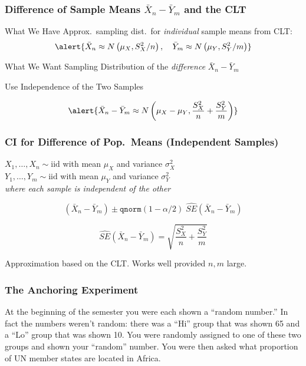 \begin{frame}
\frametitle{Difference of Sample Means $\bar{X}_n-\bar{Y}_m$ and the CLT}
\begin{block}{What We Have}
Approx.\ sampling dist.\ for \emph{individual}  sample means from CLT:
\[\alert{\bar{X}_n\approx N\left(\mu_X, S_X^2/n\right), \quad \bar{Y}_m\approx N\left(\mu_Y, S_Y^2/m\right)}\]
\end{block}

\begin{block}{What We Want}
Sampling Distribution of the \emph{difference} $\bar{X}_n - \bar{Y}_m$
\end{block}

\begin{block}{Use Independence of the Two Samples}
  
  \[\alert{\bar{X}_n - \bar{Y}_m\approx N\left( \mu_X - \mu_Y, \displaystyle \frac{S_X^2}{n} + \frac{S_Y^2}{m}\right)}\]

\end{block}


\end{frame}
\begin{frame}
\frametitle{CI for Difference of Pop.\ Means (Independent Samples)}

$X_1, \hdots, X_n \sim \mbox{iid}$ with mean $\mu_X$ and variance $\sigma_X^2$\\ $Y_1, \hdots, Y_m \sim \mbox{iid}$ with mean $\mu_Y$ and variance $\sigma_Y^2$\\
\emph{where each sample is independent of the other } 

\[\left(\bar{X}_n - \bar{Y}_m\right) \pm \texttt{qnorm}(1-\alpha/2)\; \widehat{SE}(\bar{X}_n - \bar{Y}_m)\]

  \[
    \widehat{SE}(\bar{X}_n - \bar{Y}_m) = \sqrt{\frac{S_X^2}{n} + \frac{S_Y^2}{m}}
  \]

	\alert{Approximation based on the CLT. Works well provided $n,m$ large.}
\end{frame}

\begin{frame}
\frametitle{The Anchoring Experiment}
At the beginning of the semester you were each shown a ``random number.'' In fact the numbers weren't random: there was a ``Hi'' group that was shown 65 and a ``Lo'' group that was shown 10. You were randomly assigned to one of these two groups and shown your ``random'' number. You were then asked what proportion of UN member states are located in Africa.  


\end{frame}


